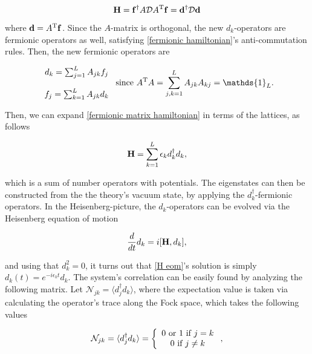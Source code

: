 \documentclass{homework}
\begin{document}
\begin{equation}
     {\bf H} = {\bf f}^\dagger A \mathcal{D} A^{\textnormal{T}} {\bf f} = {\bf d}^\dagger \mathcal{D} {\bf d}
     \label{fermionic matrix hamiltonian}
\end{equation}

where ${\bf d} = A^{\textnormal{T}} {\bf f}$. Since the $A$-matrix is orthogonal, the new $d_k$-operators are fermionic operators as well, satisfying \eqref{fermionic hamiltonian}'s anti-commutation rules. Then, the new fermionic operators are 

\begin{equation*}
    \begin{array}{c}
         d_k = \sum_{j=1}^{L} A_{jk} f_j  \\ 
         \\
         f_j = \sum_{k=1}^{L} A_{jk} d_k 
    \end{array} \textnormal{ since } A\transpose A = \sum_{j,k = 1}^{L} A_{jk} A_{kj} = \mathds{1}_{L}.
\end{equation*}

Then, we can expand \eqref{fermionic matrix hamiltonian} in terms of the lattices, as follows 

\begin{equation}
    {\bf H} = \sum_{k = 1}^{L} \epsilon_k d_k^\dagger d_k,
\end{equation}

which is a sum of number operators with potentials. The eigenstates can then be constructed from the the theory's vacuum state, by applying the $d_k^{\dagger}$-fermionic operators. In the Heisenberg-picture, the $d_k$-operators can be evolved via the Heisenberg equation of motion

\begin{equation}
\frac{d}{dt} d_k = i [{\bf H}, d_k],
\label{H eom}
\end{equation}

and using that $d_k^2 = 0$, it turns out that \eqref{H eom}'s solution is simply $d_k(t) = e^{-i\epsilon_k t} d_k$. The system's correlation can be easily found by analyzing the following matrix. Let $\mathcal{N}_{jk} = \langle d_j^\dagger d_k \rangle$, where the expectation value is taken via calculating the operator's trace along the Fock space, which takes the following values 

\begin{equation}
    \mathcal{N}_{jk} = \langle d_j^\dagger d_k \rangle = \left\{\begin{array}{c}
        0 \textnormal{ or } 1 \textnormal{ if } j=k  \\
        0 \textnormal{ if } j \neq k 
    \end{array} \right.,
\end{equation}
\end{document}
